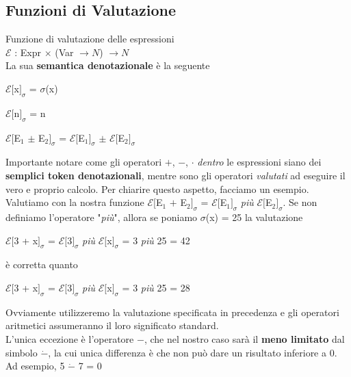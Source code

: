 \documentclass[10pt]{book}
\begin{document}
\subsection{Funzioni di Valutazione}
\begin{list}{}{Inoltre, per valutare le espressioni generate dalla grammatica, servono delle \textbf{funzioni di valutazione}. Esse \textbf{trovano il significato di ogni espressione}}
	\item Funzione di valutazione delle espressioni\\$\mathscr{E}$ : Expr $\times$ (Var $\rightarrow N$) $\rightarrow N$\\La sua \textbf{semantica denotazionale} è la seguente
	\begin{multicols}{2}
	\begin{list}{}{}
		\item $\mathscr{E}[$x$]_\sigma$ = $\sigma$(x)
		\item $\mathscr{E}[$n$]_\sigma$ = n
		\item $\mathscr{E}[$E$_1$ $\pm$ E$_2]_\sigma$ = $\mathscr{E}[$E$_1]_\sigma$ $\pm$ $\mathscr{E}[$E$_2]_\sigma$
	\end{list}
	\end{multicols}
	Importante notare come gli operatori $+$, $-$, $\cdot$ \textit{dentro} le espressioni siano dei \textbf{semplici token denotazionali}, mentre sono gli operatori \textit{valutati} ad eseguire il vero e proprio calcolo. Per chiarire questo aspetto, facciamo un esempio. Valutiamo con la nostra funzione $\mathscr{E}[$E$_1$ $+$ E$_2]_\sigma$ = $\mathscr{E}[$E$_1]_\sigma$ \textit{più} $\mathscr{E}[$E$_2]_\sigma$. Se non definiamo l'operatore "\textit{più}", allora se poniamo $\sigma$(x) = 25 la valutazione
	\begin{list}{}{}
		\item $\mathscr{E}[$3 + x$]_\sigma$ = $\mathscr{E}[$3$]_\sigma$ \textit{più} $\mathscr{E}[$x$]_\sigma$ = 3 \textit{più} 25 = 42
	\end{list}
	è corretta quanto
	\begin{list}{}{}
		\item $\mathscr{E}[$3 + x$]_\sigma$ = $\mathscr{E}[$3$]_\sigma$ \textit{più} $\mathscr{E}[$x$]_\sigma$ = 3 \textit{più} 25 = 28
	\end{list}
	Ovviamente utilizzeremo la valutazione specificata in precedenza e gli operatori aritmetici assumeranno il loro significato standard.\\
	L'unica eccezione è l'operatore $-$, che nel nostro caso sarà il \textbf{meno limitato} dal simbolo $\dot{-}$, la cui unica differenza è che non può dare un risultato inferiore a 0. Ad esempio, 5 $\dot{-}$ 7 = 0

\end{list}
\end{document}
